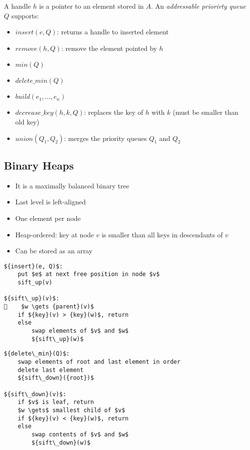 A handle $h$ is a pointer to an element stored in $A$.
An \emph{addressable priorirty queue} $Q$ supports:
\begin{itemize}
\item ${insert}(e, Q)$: returns a handle to inserted element
\item ${remove}(h, Q)$: remove the element pointed by $h$
\item ${min}(Q)$
\item ${delete\_min}(Q)$
\item ${build}(e_1, \ldots, e_n)$
\item ${decrease\_key}(h, k, Q)$: replaces the key of $h$ with $k$ (must be smaller than old key)
\item ${union}(Q_1, Q_2)$: merges the priority queues $Q_1$ and $Q_2$
\end{itemize}

\subsection{Binary Heaps}

\begin{itemize}
\item It is a maximally balanced binary tree
\item Last level is left-aligned
\item One element per node
\item Heap-ordered: key at node $v$ is smaller than all keys in descendants of $v$
\item Can be stored as an array
\end{itemize}

\begin{lstlisting}[mathescape]
${insert}(e, Q)$:
    put $e$ at next free position in node $v$
    sift_up(v)
    
${sift\_up}(v)$:
    $w \gets {parent}(v)$
    if ${key}(v) > {key}(w)$, return
    else
        swap elements of $v$ and $w$
        ${sift\_up}(w)$
\end{lstlisting}

\begin{lstlisting}[mathescape]
${delete\_min}(Q)$:
    swap elements of root and last element in order
    delete last element
    ${sift\_down}({root})$

${sift\_down}(v)$:
    if $v$ is leaf, return
    $w \gets$ smallest child of $v$
    if ${key}(v) < {key}(w)$, return
    else
        swap contents of $v$ and $w$
        ${sift\_down}(w)$
\end{lstlisting}

